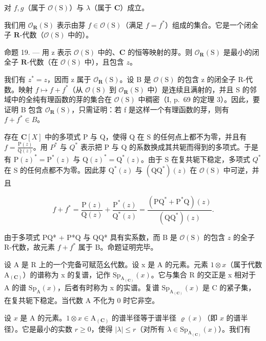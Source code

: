 对 \(f,g\)（属于 \(\mathcal{O}(\mathrm{S})\)）与 \(\lambda\)（属于 \(\mathbf{C}\)）成立。

我们用 \(\mathcal{O}_{\mathbf{R}}(\mathrm{S})\) 表示由芽 \(f \in \mathcal{O}(\mathrm{S})\)（满足 \(f = f^{*}\)）组成的集合。它是一个闭全子 \(\mathbf{R}\)-代数（\(\mathcal{O}(\mathrm{S})\) 中的）。

命题 19. --- 用 z 表示 \(\mathcal{O}(\mathrm{S})\) 中的、\(\mathbf{C}\) 的恒等映射的芽。则 \(\mathcal{O}_{\mathbf{R}}(\mathrm{S})\) 是最小的闭全子 \(\mathbf{R}\)-代数（在 \(\mathcal{O}(\mathrm{S})\) 中），且包含 \(z\)。

我们有 \(z^{*} = z\)，因而 z 属于 \(\mathcal{O}_{\mathbf{R}}(\mathrm{S})\)。设 B 是 \(\mathcal{O}(\mathrm{S})\) 的包含 z 的闭全子 R-代数。映射 \(f \mapsto f + f^{*}\)（从 \(\mathcal{O}(\mathrm{S})\) 到 \(\mathcal{O}_{\mathbf{R}}(\mathrm{S})\) 中）是连续且满射的，并且 S 的邻域中的全纯有理函数的芽的集合在 \(\mathcal{O}(\mathrm{S})\) 中稠密（I, p.~69 的定理 3）。因此，要证明 B 包含 \(\mathcal{O}_{\mathbf{R}}(\mathrm{S})\)，只需证明：若 f 是这样一个有理函数的芽，则有 \(f + f^{*} \in B\)。

存在 \(\mathbf{C}[X]\) 中的多项式 P 与 Q，使得 Q 在 S 的任何点上都不为零，并且有 \(f = \frac{\mathrm{P}(z)}{\mathrm{Q}(z)}\)。用 \(P^{*}\) 与 \(Q^{*}\) 表示把 P 与 Q 的系数换成其共轭而得到的多项式。于是有 \(\mathrm{P}(z)^{*} = \mathrm{P}^{*}(z)\) 与 \(\mathrm{Q}(z)^{*} = \mathrm{Q}^{*}(z)\)。由于 S 在复共轭下稳定，多项式 \(Q^{*}\) 在 S 的任何点都不为零。因此芽 \(\mathrm{Q}^{*}(z)\) 与 \((\mathrm{QQ}^{*})(z)\) 在 \(\mathcal{O}(\mathrm{S})\) 中可逆，并且

\[
f + f ^ {*} = \frac {\mathrm{P} (z)}{\mathrm{Q} (z)} + \frac {\mathrm{P} ^ {*} (z)}{\mathrm{Q} ^ {*} (z)} = \frac {(\mathrm{PQ} ^ {*} + \mathrm{P} ^ {*} \mathrm{Q}) (z)}{(\mathrm{QQ} ^ {*}) (z)}.
\]

由于多项式 PQ* + P*Q 与 QQ* 具有实系数，而 B 是 \(\mathcal{O}(\mathrm{S})\) 的包含 \(z\) 的全子 R-代数，故元素 \(f + f^{*}\) 属于 B。命题证明完毕。

设 A 是 R 上的一个完备可赋范幺代数。设 x 是 A 的元素。元素 \(1 \otimes x\)（属于代数 \(\mathrm{A}_{(\mathbf{C})}\)）的谱称为 x 的复谱，记作 \(\mathrm{Sp}_{\mathrm{A}_{(\mathbf{C})}}(x)\)。它与集合 R 的交正是 x 相对于 A 的谱 \(\mathrm{Sp}_{\mathrm{A}}(x)\)，后者有时称为 x 的实谱。复谱 \(\mathrm{Sp}_{\mathrm{A}_{(\mathbf{C})}}(x)\) 是 C 的紧子集，在复共轭下稳定。当代数 A 不化为 0 时它非空。

设 \(x\) 是 A 的元素。\(1 \otimes x \in \mathrm{A}_{(\mathbf{C})}\) 的谱半径等于谱半径 \(\varrho(x)\)（即 \(x\) 的谱半径）。它是最小的实数 \(r \geqslant 0\)，使得 \(|\lambda| \leqslant r\)（对所有 \(\lambda \in \mathrm{Sp}_{\mathrm{A}_{(\mathbf{C})}}(x)\)）。我们有

